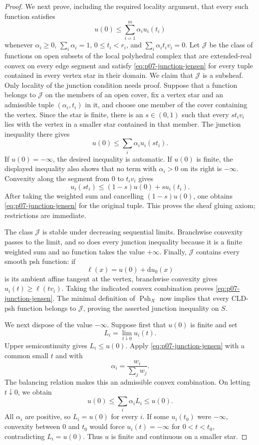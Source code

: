 \begin{proof}
We next prove, including the required locality argument, that every such
function satisfies
\begin{equation}
\label{eq:p07-junction-jensen}
 u(0)\leq\sum_{i=1}^m\alpha_i u_i(t_i)
\end{equation}
whenever $\alpha_i\geq0$, $\sum_i\alpha_i=1$,
$0\leq t_i<r_i$, and $\sum_i\alpha_i t_i v_i=0$.
Let $\mathscr J$ be the class of functions on open subsets of the local
polyhedral complex that are extended-real convex on every edge segment and
satisfy \eqref{eq:p07-junction-jensen} for every tuple contained in every
vertex star in their domain.  We claim that $\mathscr J$ is a subsheaf.
Only locality of the junction condition needs proof.  Suppose that a
function belongs to $\mathscr J$ on the members of an open cover, fix a
vertex star and an admissible tuple $(\alpha_i,t_i)$ in it, and choose one
member of the cover containing the vertex.  Since the star is finite, there
is an $s\in(0,1)$ such that every $s t_i v_i$ lies with the vertex in a
smaller star contained in that member.  The junction inequality there gives
\[
                         u(0)\leq
                         \sum_i\alpha_i u_i(s t_i).
\]
If $u(0)=-\infty$, the desired inequality is automatic.  If $u(0)$ is
finite, the displayed inequality also shows that no term with
$\alpha_i>0$ on its right is $-\infty$.  Convexity along the segment from
$0$ to $t_i v_i$ gives
\[
                  u_i(s t_i)\leq
                  (1-s)u(0)+s u_i(t_i).
\]
After taking the weighted sum and cancelling $(1-s)u(0)$, one obtains
\eqref{eq:p07-junction-jensen} for the original tuple.  This proves the
sheaf gluing axiom; restrictions are immediate.

The class $\mathscr J$ is stable under decreasing sequential limits.
Branchwise convexity passes to the limit, and so does every junction
inequality because it is a finite weighted sum and no function takes the
value $+\infty$.  Finally, $\mathscr J$ contains every smooth psh function:
if
\[
                   \ell(x)=u(0)+\mathrm d u_0(x)
\]
is its ambient affine tangent at the vertex, branchwise convexity gives
$u_i(t)\geq\ell(tv_i)$.  Taking the indicated convex combination proves
\eqref{eq:p07-junction-jensen}.  The minimal definition of
$\operatorname{Psh}_X$ now implies that every CLD-psh function belongs to
$\mathscr J$, proving the asserted junction inequality on $S$.

We next dispose of the value $-\infty$.  Suppose first that $u(0)$ is
finite and set
\[
                  L_i=\lim_{t\downarrow0}u_i(t).
\]
Upper semicontinuity gives $L_i\leq u(0)$.  Apply
\eqref{eq:p07-junction-jensen} with a common small $t$ and with
\[
                 \alpha_i=\frac{w_i}{\sum_jw_j}.
\]
The balancing relation makes this an admissible convex combination.  On
letting $t\downarrow0$, we obtain
\[
 u(0)\leq\sum_i\alpha_iL_i\leq u(0).
\]
All $\alpha_i$ are positive, so $L_i=u(0)$ for every $i$.  If some
$u_i(t_0)$ were $-\infty$, convexity between $0$ and $t_0$ would force
$u_i(t)=-\infty$ for $0<t<t_0$, contradicting $L_i=u(0)$.  Thus $u$ is
finite and continuous on a smaller star.


\end{proof}
